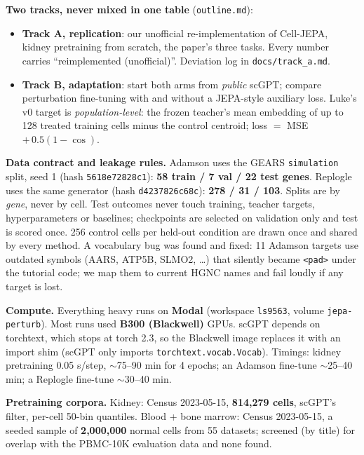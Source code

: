 \documentclass[11pt]{article}
\newcommand{\code}[1]{\texttt{\small #1}}
\begin{document}
\textbf{Two tracks, never mixed in one table} (\code{outline.md}):
\begin{itemize}
\item \textbf{Track A, replication}: our unofficial re-implementation of Cell-JEPA, kidney pretraining from scratch, the paper's three tasks. Every number carries ``reimplemented (unofficial)''. Deviation log in \code{docs/track\_a.md}.
\item \textbf{Track B, adaptation}: start both arms from \emph{public} scGPT; compare perturbation fine-tuning with and without a JEPA-style auxiliary loss. Luke's v0 target is \emph{population-level}: the frozen teacher's mean embedding of up to 128 treated training cells minus the control centroid; loss $=$ MSE $+\,0.5(1-\cos)$.
\end{itemize}

\textbf{Data contract and leakage rules.} Adamson uses the GEARS \code{simulation} split, seed 1 (hash \code{5618e72828c1}): \textbf{58 train / 7 val / 22 test genes}. Replogle uses the same generator (hash \code{d4237826c68c}): \textbf{278 / 31 / 103}. Splits are by \emph{gene}, never by cell. Test outcomes never touch training, teacher targets, hyperparameters or baselines; checkpoints are selected on validation only and test is scored once. 256 control cells per held-out condition are drawn once and shared by every method. A vocabulary bug was found and fixed: 11 Adamson targets use outdated symbols (AARS, ATP5B, SLMO2, \dots) that silently became \code{<pad>} under the tutorial code; we map them to current HGNC names and fail loudly if any target is lost.

\textbf{Compute.} Everything heavy runs on \textbf{Modal} (workspace \code{ls9563}, volume \code{jepa-perturb}). Most runs used \textbf{B300 (Blackwell)} GPUs. scGPT depends on torchtext, which stops at torch 2.3, so the Blackwell image replaces it with an import shim (scGPT only imports \code{torchtext.vocab.Vocab}). Timings: kidney pretraining 0.05 s/step, $\sim$75--90 min for 4 epochs; an Adamson fine-tune $\sim$25--40 min; a Replogle fine-tune $\sim$30--40 min.

\textbf{Pretraining corpora.} Kidney: Census 2023-05-15, \textbf{814,279 cells}, scGPT's filter, per-cell 50-bin quantiles. Blood + bone marrow: Census 2023-05-15, a seeded sample of \textbf{2,000,000} normal cells from 55 datasets; screened (by title) for overlap with the PBMC-10K evaluation data and none found.

\end{document}
